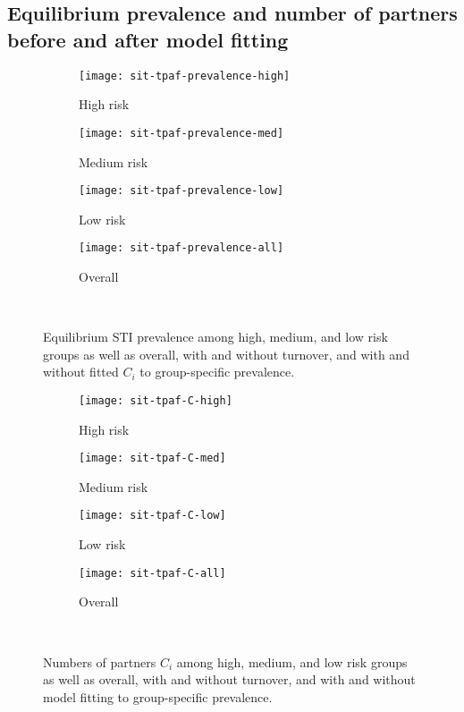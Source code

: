 \subsection{Equilibrium prevalence and number of partners before and after model fitting}
\begin{figure}[H]
  \begingroup\centering
  \begin{subfigure}{0.4\linewidth}
    \texttt{[image: sit-tpaf-prevalence-high]}
    \caption{High risk}
    \label{fig:tpaf-prevalence-high}
  \end{subfigure}
  \begin{subfigure}{0.4\linewidth}
    \centering\texttt{[image: sit-tpaf-prevalence-med]}
    \caption{Medium risk}
    \label{fig:tpaf-prevalence-med}
  \end{subfigure}
  \begin{subfigure}{0.4\linewidth}
    \texttt{[image: sit-tpaf-prevalence-low]}
    \caption{Low risk}
    \label{fig:tpaf-prevalence-low}
  \end{subfigure}
  \begin{subfigure}{0.4\linewidth}
    \texttt{[image: sit-tpaf-prevalence-all]}
    \caption{Overall}
    \label{fig:tpaf-prevalence-all}
  \end{subfigure}
  \\\endgroup
  \caption{Equilibrium STI prevalence
    among high, medium, and low risk groups as well as overall,
    with and without turnover,
    and with and without fitted $C_i$ to group-specific prevalence.}
  \label{fig:tpaf-prevalence}
\end{figure}
\begin{figure}[H]
  \begingroup\centering
  \begin{subfigure}{0.4\linewidth}
    \texttt{[image: sit-tpaf-C-high]}
    \caption{High risk}
    \label{fig:tpaf-C-high}
  \end{subfigure}
  \begin{subfigure}{0.4\linewidth}
    \texttt{[image: sit-tpaf-C-med]}
    \caption{Medium risk}
    \label{fig:tpaf-C-med}
  \end{subfigure}
  \begin{subfigure}{0.4\linewidth}
    \texttt{[image: sit-tpaf-C-low]}
    \caption{Low risk}
    \label{fig:tpaf-C-low}
  \end{subfigure}
  \begin{subfigure}{0.4\linewidth}
    \texttt{[image: sit-tpaf-C-all]}
    \caption{Overall}
    \label{fig:tpaf-C-all}
  \end{subfigure}
  \\\endgroup
  \caption{Numbers of partners $C_i$
    among high, medium, and low risk groups as well as overall,
    with and without turnover,
    and with and without model fitting to group-specific prevalence.}
  \label{fig:tpaf-C}
\end{figure}
